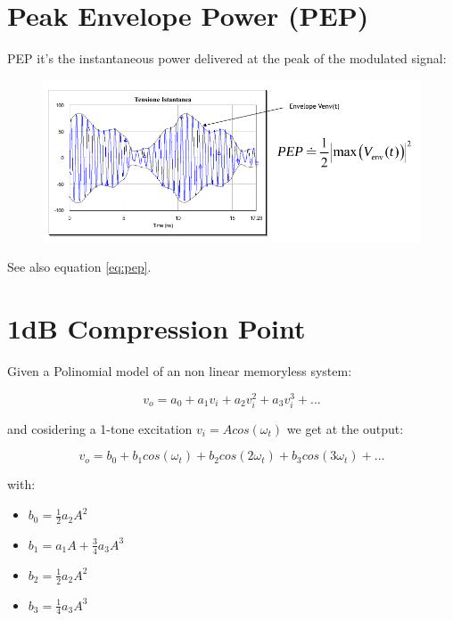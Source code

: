 
\section{Peak Envelope Power (PEP)} %
\label{sub:peak_envelope_power_pep_}

PEP it's the instantaneous power delivered at the peak of the modulated signal:


\begin{figure}[ht]
	\centering
	\includegraphics[scale=0.5]{Immagini/pep}
	
	\label{fig:link}
\end{figure}

See also equation \ref{eq:pep}.


\section{1dB Compression Point} %
\label{sec:1db_compression_point}

Given a Polinomial model of an non linear memoryless system:

\begin{equation}
	v_o=a_0+a_1v_i+a_2v_i^2+a_3v_i^3+...
\end{equation}

and cosidering a 1-tone excitation $v_i=Acos(\omega_t) $ we get at the output:

\begin{equation}
	v_o=b_0+b_1cos(\omega_t) +b_2cos(2\omega_t) +b_3cos(3\omega_t) +...
\end{equation}

with:

\begin{itemize}
	\item $b_0= \frac{1}{2}a_2A^2$

	\item $b_1= a_1A+\frac{3}{4}a_3A^3$

	\item $b_2= \frac{1}{2}a_2A^2$

	\item $b_3= \frac{1}{4}a_3A^3$
\end{itemize}

